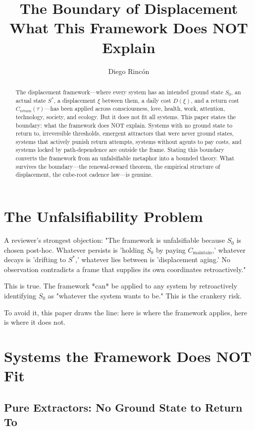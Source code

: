 \documentclass[12pt]{article}
\title{The Boundary of Displacement\\
What This Framework Does NOT Explain}
\author{Diego Rincón}
\date{}
\begin{document}
\maketitle

\begin{abstract}
The displacement framework—where every system has an intended ground state $S_0$, an actual state $S^*$, a displacement $\xi$ between them, a daily cost $D(\xi)$, and a return cost $C_{\text{return}}(\tau)$—has been applied across consciousness, love, health, work, attention, technology, society, and ecology. But it does not fit all systems. This paper states the boundary: what the framework does NOT explain. Systems with no ground state to return to, irreversible thresholds, emergent attractors that were never ground states, systems that actively punish return attempts, systems without agents to pay costs, and systems locked by path-dependence are outside the frame. Stating this boundary converts the framework from an unfalsifiable metaphor into a bounded theory. What survives the boundary—the renewal-reward theorem, the empirical structure of displacement, the cube-root cadence law—is genuine.
\end{abstract}

\section{The Unfalsifiability Problem}

A reviewer's strongest objection: "The framework is unfalsifiable because $S_0$ is chosen post-hoc. Whatever persists is 'holding $S_0$ by paying $C_{\text{maintain}}$,' whatever decays is 'drifting to $S^*$,' whatever lies between is 'displacement aging.' No observation contradicts a frame that supplies its own coordinates retroactively."

This is true. The framework *can* be applied to any system by retroactively identifying $S_0$ as "whatever the system wants to be." This is the crankery risk.

To avoid it, this paper draws the line: here is where the framework applies, here is where it does not.

\section{Systems the Framework Does NOT Fit}

\subsection{Pure Extractors: No Ground State to Return To}
\end{document}
